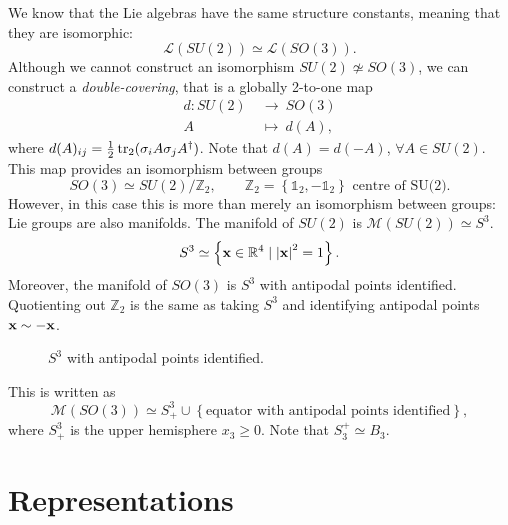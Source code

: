 We know that the Lie algebras have the same structure constants, meaning that they are isomorphic:
\begin{equation}
  \mathscr{L}(SU(2)) \simeq \mathscr{L}(SO(3)).
\end{equation}
Although we cannot construct an isomorphism $SU(2) \not\simeq SO(3)$, we can construct a \emph{double-covering}, that is a globally 2-to-one map
\begin{equation}
  \begin{split}
    d \colon SU(2) \ &\to\  SO(3) \\
    A \ &\mapsto\  d(A),
  \end{split}
\end{equation}
where $d(A)_{ij} = \frac{1}{2} \tr_2 ( \sigma_i A \sigma_j A^{\dagger})$. Note that $d(A) = d(-A)$, $\forall A \in SU(2)$.
This map provides an isomorphism between groups
\begin{equation}
  SO(3) \simeq SU(2) / \mathbb{Z}_2, \qquad \mathbb{Z}_2 = \left\{ \mathbb{1}_2, -\mathbb{1}_2 \right\} \text{ centre of SU(2)}.
\end{equation}
However, in this case this is more than merely an isomorphism between groups: Lie groups are also manifolds. 
The manifold of $SU(2)$ is $\mathcal{M}(SU(2)) \simeq S^3$.
\begin{equation}
  S^3 \simeq \left\{ \vb{x} \in \mathbb{R}^4 \mid \abs{\vb{x}}^2 = 1 \right\}.
\end{equation}
Moreover, the manifold of $SO(3)$ is $S^3$ with antipodal points identified.
Quotienting out $\mathbb{Z}_2$ is the same as taking $S^3$ and identifying antipodal points $\vb{x} \sim -\vb{x}$.
\begin{figure}[tbhp]
  \centering
  \def\svgwidth{0.3\columnwidth}
  
  \caption{$S^3$ with antipodal points identified.}
  \label{fig:l9f1}
\end{figure}
This is written as
\begin{equation}
  \mathcal{M}(SO(3)) \simeq S^3_+ \cup \left\{ \text{equator with antipodal points identified} \right\},
\end{equation}
where $S^3_+$ is the upper hemisphere $x_3 \geq 0$. Note that $S^+_3 \simeq B_3$.

\section{Representations}%
\label{sec:representations}


